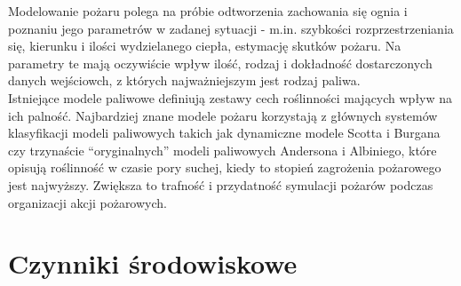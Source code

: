 \documentclass[a4paper, 11pt]{article}
\begin{document}
	Modelowanie pożaru polega na próbie odtworzenia zachowania się ognia i poznaniu jego parametrów w zadanej sytuacji - m.in. szybkości rozprzestrzeniania się, kierunku i ilości wydzielanego ciepła, estymację skutków pożaru. Na parametry te mają oczywiście wpływ ilość, rodzaj i dokładność dostarczonych danych wejściowch, z których najważniejszym jest rodzaj paliwa. \\
	\indent Istniejące modele paliwowe definiują zestawy cech roślinności mających wpływ na ich palność. Najbardziej znane modele pożaru korzystają z głównych systemów klasyfikacji modeli paliwowych takich jak dynamiczne modele Scotta i Burgana czy trzynaście ``oryginalnych'' modeli paliwowych Andersona i Albiniego, które opisują roślinność w czasie pory suchej, kiedy to stopień zagrożenia pożarowego jest najwyższy. Zwiększa to trafność i przydatność symulacji pożarów podczas organizacji akcji pożarowych.
	
	
	
	
	
	
	
	
	
	\section*{Czynniki środowiskowe}%

	\indent 
	
\end{document}
